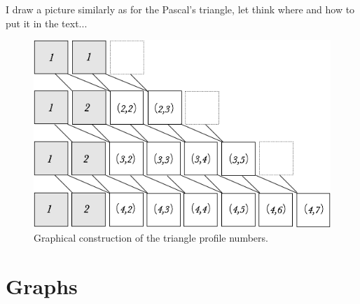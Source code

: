 {\Denis I draw a picture similarly as for the Pascal's triangle, let think where and how to put it in the text...}
\begin{figure}
\begin{center}
        \includegraphics[scale=0.4]{FiguresMaths/TreeProfile}
        \caption{Graphical construction of the triangle profile numbers.}
        \label{Fig:treeprofile}
\end{center}
\end{figure}




\section{Graphs}

